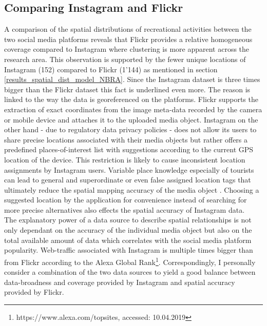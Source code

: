 \subsection{Comparing Instagram and Flickr}
A comparison of the spatial distributions of recreational activities between the two social media platforms reveals that Flickr provides a relative homogeneous coverage compared to Instagram where clustering is more apparent across the research area. This observation is supported by the fewer unique locations of Instagram (152) compared to Flickr (1'144) as mentioned in section \ref{results_spatial_dist_model_NBRA}. Since the Instagram dataset is three times bigger than the Flickr dataset this fact is underlined even more. The reason is linked to the way the data is georeferenced on the platforms. Flickr supports the extraction of exact coordinates from the image meta-data recorded by the camera or mobile device and attaches it to the uploaded media object. Instagram on the other hand - due to regulatory data privacy policies - does not allow its users to share precise locations associated with their media objects but rather offers a predefined places-of-interest list with suggestions according to the current GPS location of the device. This restriction is likely to cause inconsistent location assignments by Instagram users. Variable place knowledge especially of tourists can lead to general and superordinate or even false assigned location tags that ultimately reduce the spatial mapping accuracy of the media object \parencite{Flatow2015}. Choosing a suggested location by the application for convenience instead of searching for more precise alternatives also effects the spatial accuracy of Instagram data. \\

The explanatory power of a data source to describe spatial relationships is not only dependant on the accuracy of the individual media object but also on the total available amount of data which correlates with the social media platform popularity. Web-traffic associated with Instagram is multiple times bigger than from Flickr according to the Alexa Global Rank\footnote{https://www.alexa.com/topsites, accessed: 10.04.2019}. Correspondingly, I personally consider a combination of the two data sources to yield a good balance between data-broadness and coverage provided by Instagram and spatial accuracy provided by Flickr.

